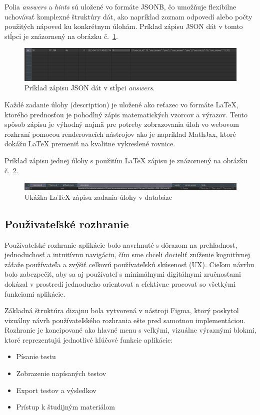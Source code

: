 Polia \textit{answers} a \textit{hints} sú uložené vo formáte JSONB, čo umožňuje flexibilne uchovávať komplexné štruktúry dát, ako napríklad zoznam odpovedí alebo počty použitých nápoved ku konkrétnym úlohám.
 Príklad zápisu JSON dát v tomto stĺpci je znázornený na obrázku č.~\ref{dbjsonb}.

 \begin{figure}[h!]
  \centering
  \includegraphics[width=\textwidth]{img/dbjsonb.png}
  \caption{Príklad zápisu JSON dát v stĺpci \textit{answers}.}
  \label{dbjsonb}
 \end{figure}

 Každé zadanie úlohy (description) je uložené ako reťazec vo formáte LaTeX, ktorého prednosťou je pohodlný zápis matematických vzorcov a výrazov. Tento spôsob zápisu je výhodný najmä pre potreby zobrazovania úloh vo webovom rozhraní pomocou renderovacích nástrojov ako je napríklad MathJax, ktoré dokážu LaTeX premeniť na kvalitne vykreslené rovnice.

Príklad zápisu jednej úlohy s použitím LaTeX zápisu je znázornený na obrázku č.~\ref{latexpriklad}.

\begin{figure}[H]
  \centering
  \includegraphics[width=\textwidth]{img/latex_example.png}
  \caption{Ukážka LaTeX zápisu zadania úlohy v databáze}
  \label{latexpriklad}
\end{figure}


\subsection{Použivateľské rozhranie}

Používateľské rozhranie aplikácie bolo navrhnuté s dôrazom na prehľadnosť, jednoduchosť a intuitívnu navigáciu, čím sme chceli docieliť zníženie kognitívnej záťaže používateľa a zvýšiť celkovú používateľskú skúsenosť (UX). Cieľom návrhu bolo zabezpečiť, aby sa aj používateľ s minimálnymi digitálnymi zručnosťami dokázal v prostredí jednoducho orientovať a efektívne pracovať so všetkými funkciami aplikácie.

Základná štruktúra dizajnu bola vytvorená v nástroji Figma, ktorý poskytol vizuálny návrh používateľského rozhrania ešte pred samotnou implementáciou. Rozhranie je koncipované ako hlavné menu s veľkými, vizuálne výraznými blokmi, ktoré reprezentujú jednotlivé kľúčové funkcie aplikácie:
\begin{itemize} 
  \item Písanie testu 
  \item Zobrazenie napísaných testov 
  \item Export testov a výsledkov 
  \item Prístup k študijným materiálom 
\end{itemize}

